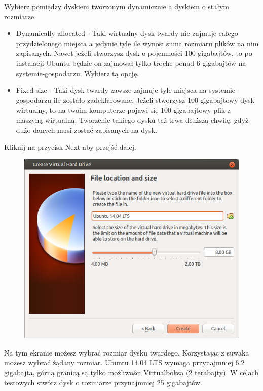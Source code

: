 Wybierz pomiędzy dyskiem tworzonym dynamicznie a dyskiem o stałym rozmiarze.
\begin{itemize}
\item \textcolor{ubuntu_orange}{Dynamically allocated} - Taki wirtualny dysk twardy nie zajmuje całego przydzielonego miejsca a jedynie tyle ile wynosi suma rozmiaru plików na nim zapisanych. Nawet jeżeli stworzysz dysk o pojemności 100 gigabajtów, to po instalacji Ubuntu będzie on zajmował tylko trochę ponad 6 gigabajtów na systemie-gospodarzu. Wybierz tą opcję.
\item \textcolor{ubuntu_orange}{Fixed size} - Taki dysk twardy zawsze zajmuje tyle miejsca na systemie-gospodarzu ile zostało zadeklarowane. Jeżeli stworzysz 100 gigabajtowy dysk wirtualny, to na twoim komputerze pojawi się 100 gigabajtowy plik z maszyną wirtualną. Tworzenie takiego dysku też trwa dłuższą chwilę, gdyż dużo danych musi zostać zapisanych na dysk.
\end{itemize}
\begin{flushright}
Kliknij na przycisk \textcolor{ubuntu_orange}{Next} aby przejść dalej.
\end{flushright}
\clearpage
\begin{figure}
                \includegraphics[width=\linewidth]{images/virtualbox_wizard6.png}
\end{figure}

Na tym ekranie możesz wybrać rozmiar dysku twardego. Korzystając z suwaka możesz wybrać żądany rozmiar. Ubuntu 14.04 LTS wymaga przynajmniej 6.2 gigabajta, górną granicą są tylko możliwości Virtualboksa (2 terabajty). W celach testowych stwórz dysk o rozmiarze przynajmniej 25 gigabajtów.

